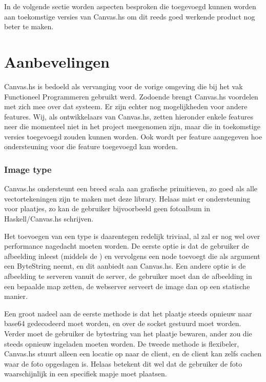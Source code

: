 In de volgende sectie worden aspecten besproken die toegevoegd kunnen worden aan toekomstige versies van Canvas.hs om dit reeds goed werkende product nog beter te maken. 

\section{Aanbevelingen} \label{sec:aanbevelingen}
Canvas.hs is bedoeld als vervanging voor de vorige omgeving die bij het vak Functioneel Programmeren gebruikt werd. Zodoende brengt Canvas.hs voordelen met zich mee over dat systeem. Er zijn echter nog mogelijkheden voor andere features. Wij, als ontwikkelaars van Canvas.hs, zetten hieronder enkele features neer die momenteel niet in het project meegenomen zijn, maar die in toekomstige versies toegevoegd zouden kunnen worden. Ook wordt per feature aangegeven hoe ondersteuning voor die feature toegevoegd kan worden.

\subsubsection{Image type}
Canvas.hs ondersteunt een breed scala aan grafische primitieven, zo goed als alle vectortekeningen zijn te maken met deze library. Helaas mist er ondersteuning voor plaatjes, zo kan de gebruiker bijvoorbeeld geen fotoalbum in Haskell/Canvas.hs schrijven.

Het toevoegen van een  type is daarentegen redelijk triviaal, al zal er nog wel over performance nagedacht moeten worden. De eerste optie is dat de gebruiker de afbeelding inleest (middels de ) en vervolgens een  node toevoegt die als argument een ByteString neemt, en dit aanbiedt aan Canvas.hs. Een andere optie is de afbeelding te serveren vanuit de server, de gebruiker moet dan de afbeelding in een bepaalde map zetten, de webserver serveert de image dan op een statische manier.

Een groot nadeel aan de eerste methode is dat het plaatje steeds opnieuw naar base64 gedecodeerd moet worden, en over de socket gestuurd moet worden. Verder moet de gebruiker de bytestring van het plaatje bewaren, ander zou die steeds opnieuw ingeladen moeten worden. De tweede methode is flexibeler, Canvas.hs stuurt alleen een locatie op naar de client, en de client kan zelfs cachen waar de foto opgeslagen is. Helaas betekent dit wel dat de gebruiker de foto waarschijnlijk in een specifiek mapje moet plaatsen.

